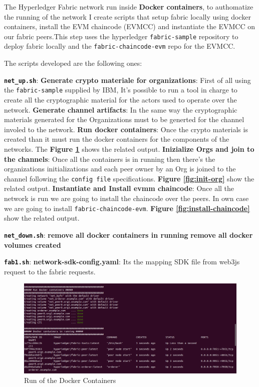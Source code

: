 The Hyperledger Fabric network run inside \textbf{Docker containers}, to authomatize the running 
of the network I create scripts that setup fabric locally using docker containers, install the EVM chaincode (EVMCC) 
and instantiate the EVMCC on our fabric peers.This step uses the hyperledger \texttt{fabric-sample} repository to deploy fabric locally 
and the \texttt{fabric-chaincode-evm} repo for the EVMCC.

The scripts developed are the following ones:

\begin{outline}
    \1 \textbf{\texttt{net\_up.sh}}:
    \2 \textbf{Generate crypto materiale for organizations}:  First of all using the \texttt{fabric-sample} supplied
    by IBM, It's possible to run a tool in charge to create all the cryptographic material for the actors 
    used to operate over the network. 
    \2 \textbf{Generate channel artifacts}: In the same way the cryptographic materials generated for the Organizations must to 
    be generted for the channel involed to the network.
    \2 \textbf{Run docker containers}: Once the crypto materials is created than it must run the docker containers
    for the components of the networks. The \textbf{Figure \ref{fig:docker-run}} shows the related output.
    \2 \textbf{Inizialize Orgs and join to the channels}:  Once all the containers is in running then there's
    the organizations initializations and each peer owner by an Org is joined to the channel following
    the \texttt{config file} specifications. \textbf{Figure \ref{fig:init-org}} show the related output.
    \2 \textbf{Instantiate and Install evmm chaincode}: Once all the network is run we are going to install the chaincode
    over the peers. In own case we are going to install \texttt{fabric-chaincode-evm}.
    \textbf{Figure \ref{fig:install-chaincode}} show the related output.

    \1 \textbf{\texttt{net\_down.sh}}:
    \2 \textbf{remove all docker containers in running}
    \2 \textbf{remove all docker volumes created}

    \1 \textbf{\texttt{fab1.sh}}:
    \2 \textbf{network-sdk-config.yaml}: Its the mapping SDK file from web3js request to the fabric requests. 

\end{outline}

\begin{figure}[!ht]
    \centering
    \includegraphics[totalheight=6cm]{img/network/net-1.png}
    \caption{Run of the Docker Containers}
    \label{fig:docker-run}
\end{figure}

